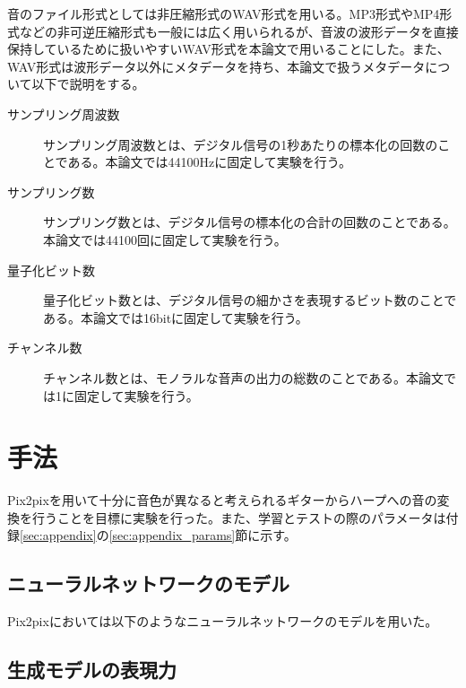 音のファイル形式としては非圧縮形式のWAV形式を用いる。MP3形式やMP4形式などの非可逆圧縮形式も一般には広く用いられるが、音波の波形データを直接保持しているために扱いやすいWAV形式を本論文で用いることにした。また、WAV形式は波形データ以外にメタデータを持ち、本論文で扱うメタデータについて以下で説明をする。

\begin{description}

\item[サンプリング周波数]\mbox{}

サンプリング周波数とは、デジタル信号の1秒あたりの標本化の回数のことである。本論文では44100Hzに固定して実験を行う。

\item[サンプリング数]\mbox{}

サンプリング数とは、デジタル信号の標本化の合計の回数のことである。本論文では44100回に固定して実験を行う。

\item[量子化ビット数]\mbox{}

量子化ビット数とは、デジタル信号の細かさを表現するビット数のことである。本論文では16bitに固定して実験を行う。

\item[チャンネル数]\mbox{}

チャンネル数とは、モノラルな音声の出力の総数のことである。本論文では1に固定して実験を行う。

\end{description}

\section{手法}

Pix2pixを用いて十分に音色が異なると考えられるギターからハープへの音の変換を行うことを目標に実験を行った。また、学習とテストの際のパラメータは付録\ref{sec:appendix}の\ref{sec:appendix_params}節に示す。

\subsection{ニューラルネットワークのモデル}

Pix2pixにおいては以下のようなニューラルネットワークのモデルを用いた。



\subsection{生成モデルの表現力}

